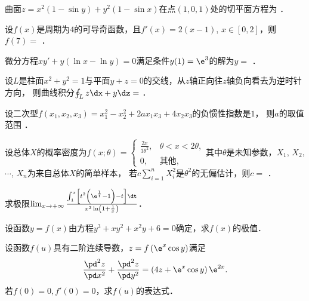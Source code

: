 \documentclass[plain,noanswer,medmath]{../../template/jnuexam}
\begin{document}


\begin{problem}
曲面$z = x^2(1 - \sin y) + y^2(1 - \sin x)$在点$(1,0,1)$处的切平面方程为 \fillin{}．
\end{problem}


\begin{problem}
设$f(x)$是周期为$4$的可导奇函数，且$f'(x)= 2(x - 1)$, $x \in[0,2]$，则$f(7) =$ \fillin{}．
\end{problem}


\begin{problem}
微分方程$xy' + y(\ln x - \ln y) = 0$满足条件$y(1) = \e^3$的解为$y =$ \fillin{}．
\end{problem}


\begin{problem}
设$L$是柱面$x^2 + y^2 = 1$与平面$y + z = 0$的交线，从$z$轴正向往$z$轴负向看去为逆时针方向，
则曲线积分$\oint_L z\dx + y\dz =$ \fillin{}．
\end{problem}


\begin{problem}
设二次型$f(x_1,x_2,x_3) = x_1^2 - x_2^2 + 2ax_1x_3 + 4x_2x_3$的负惯性指数是$1$，
则$a$的取值范围 \fillin{}．
\end{problem}


\begin{problem}
设总体$X$的概率密度为$f\left(x;\theta \right) = \begin{cases}
  \frac{2x}{3\theta^2}, & \theta < x < 2\theta , \\
                     0, & \text{其他},
\end{cases}$其中$\theta$是未知参数，$X_1$, $X_2$, $\cdots$, $X_n$为来自总体$X$的简单样本，
若$c\sum_{i = 1}^n X_i^2$是$\theta^2$的无偏估计，则$c =$ \fillin{}．
\end{problem}




\begin{problem}[points=10]
求极限$\lim_{x \to +\infty}
\frac{\int_1^x \left[t^2\left(\e^{\frac{1}{t}} - 1\right) - t \right]\dt}
     {x^2\ln \left(1 + \frac{1}{x}\right)}$．
\end{problem}


\begin{problem}[points=10]
设函数$y = f(x)$由方程$y^3 + xy^2 + x^2 y + 6 = 0$确定，求$f(x)$的极值．
\end{problem}


\begin{problem}[points=10]
设函数$f(u)$具有二阶连续导数，$z = f\left(\e^x\cos y \right)$满足
$$\frac{\pd^2 z}{\pd x^2} + \frac{\pd^2 z}{\pd y^2} = \left(4z + \e^x\cos y \right) \e^{2x}.$$
若$f(0) = 0,f'(0) = 0$，求$f(u)$的表达式．
\end{problem}
\end{document}
